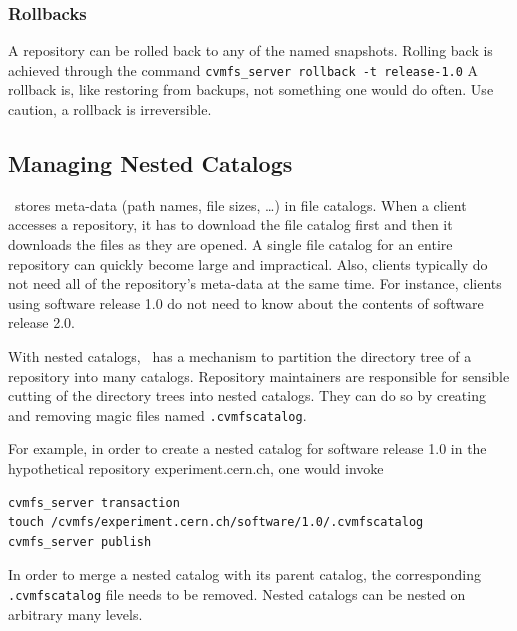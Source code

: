 \subsubsection{Rollbacks}
A repository can be rolled back to any of the named snapshots.
Rolling back is achieved through the command \texttt{cvmfs\_server rollback -t release-1.0}
A rollback is, like restoring from backups, not something one would do often.
Use caution, a rollback is irreversible.

\subsection{Managing Nested Catalogs}
\label{sct:nestedcatalogs}

\cvmfs\ stores meta-data (path names, file sizes, \dots) in file catalogs.
When a client accesses a repository, it has to download the file catalog first and then it downloads the files as they are opened.
A single file catalog for an entire repository can quickly become large and impractical.
Also, clients typically do not need all of the repository's meta-data at the same time.
For instance, clients using software release 1.0 do not need to know about the contents of software release 2.0.

With nested catalogs, \cvmfs\ has a mechanism to partition the directory tree of a repository into many catalogs.
Repository maintainers are responsible for sensible cutting of the directory trees into nested catalogs.
They can do so by creating and removing magic files named \texttt{.cvmfscatalog}.

For example, in order to create a nested catalog for software release 1.0 in the hypothetical repository experiment.cern.ch, one would invoke
\begin{verbatim}
cvmfs_server transaction
touch /cvmfs/experiment.cern.ch/software/1.0/.cvmfscatalog
cvmfs_server publish
\end{verbatim}

In order to merge a nested catalog with its parent catalog, the corresponding \texttt{.cvmfscatalog} file needs to be removed.
Nested catalogs can be nested on arbitrary many levels.

